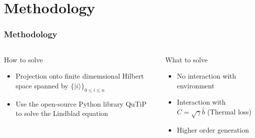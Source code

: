 \documentclass{beamer}
\newcommand*\ket[1]{|{#1}\rangle}
\begin{document}
\section{Methodology}
\begin{frame}[c]
  \frametitle{Methodology}
  \begin{columns}
    \begin{column}{0.5\textwidth}
      \begin{block}{How to solve}
        \begin{itemize}
          \item Projection onto finite dimemsional Hilbert space spanned by $\{\ket{i}\}_{0\le i\le n}$
          \item Use the open-source Python library QuTiP to solve the Lindblad equation
        \end{itemize}
      \end{block}
    \end{column}
    \pause
    \begin{column}{0.5\textwidth}
      \begin{block}{What to solve}
        \begin{itemize}
          \item No interaction with environment
          \item Interaction with $C=\sqrt{\gamma}\hat{b}$ (Thermal loss)
          \item Higher order generation
        \end{itemize}
      \end{block}
    \end{column}
  \end{columns}
\end{frame}
\end{document}
